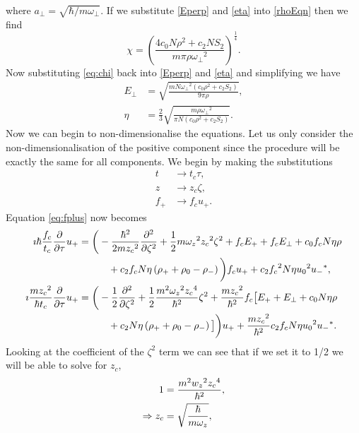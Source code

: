 where $a_\perp = \sqrt{\hbar / m\omega_\perp}$. If we substitute \eqref{Eperp} and \eqref{eta} into \eqref{rhoEqn} then we find
\begin{equation}
    \chi = \left(\frac{4 c_0 N \rho^2 + c_2 N S_2}{m\pi\rho{\omega_\perp}^2}\right)^{\frac{1}{4}}. \label{eq:chi}
\end{equation}
Now substituting \eqref{eq:chi} back into \eqref{Eperp} and \eqref{eta} and simplifying we have
\begin{align}
    E_\perp &= \sqrt{\frac{mN{\omega_\perp}^2 \left(c_0 \rho^2 + c_2 S_2\right)}{9\pi\rho}},\\
    \eta &= \frac{2}{3}\sqrt{\frac{m\rho{\omega_\perp}^2}{\pi N \left(c_0 \rho^2 + c_2 S_2\right)}}.
\end{align}
Now we can begin to non-dimensionalise the equations. Let us only consider the non-dimensionalisation of the positive component since the procedure will be exactly the same for all components. We begin by making the substitutions
\begin{align*}
    t &\to t_c \tau,\\
    z &\to z_c \zeta,\\
    f_+ &\to f_c u_+.
\end{align*}
Equation \eqref{eq:fplus} now becomes
\begin{align*}
    \imath\hbar\frac{f_c}{t_c}\frac{\partial}{\partial \tau} u_{+} &= \bigg(-\frac{\hbar^2}{2m{z_c}^2}\frac{\partial^2}{\partial \zeta^2} + \frac{1}{2}m{\omega_z}^2{z_c}^2\zeta^2 + f_c E_+ + f_c E_\perp + c_0 f_c N\eta\rho \notag \\
        &\quad \quad\quad + c_2 f_c N\eta\left( \rho_+ + \rho_0 - \rho_- \right) \bigg)f_c u_+ + c_2 {f_c}^2 N\eta{u_0}^2{u_-}^*,\\
    \imath\frac{m{z_c}^2}{\hbar t_c}\frac{\partial}{\partial \tau} u_{+} &= \bigg(-\frac{1}{2}\frac{\partial^2}{\partial \zeta^2} + \frac{1}{2}\frac{m^2{\omega_z}^2{z_c}^4}{\hbar^2}\zeta^2 + \frac{m{z_c}^2}{\hbar^2}f_c\big[E_+ + E_\perp + c_0  N\eta\rho \notag \\
        &\quad \quad\quad + c_2 N\eta\left( \rho_+ + \rho_0 - \rho_- \right) \big]\bigg) u_+ + \frac{m{z_c}^2}{\hbar^2} c_2 f_c N\eta{u_0}^2{u_-}^*.
\end{align*}
Looking at the coefficient of the $\zeta^2$ term we can see that if we set it to 1/2 we will be able to solve for $z_c$,
\begin{align}
    1 &= \frac{m^2 {w_z}^2 {z_c}^4}{\hbar^2},\notag\\
    \Rightarrow z_c &= \sqrt{\frac{\hbar}{m\omega_z}},
\end{align}
